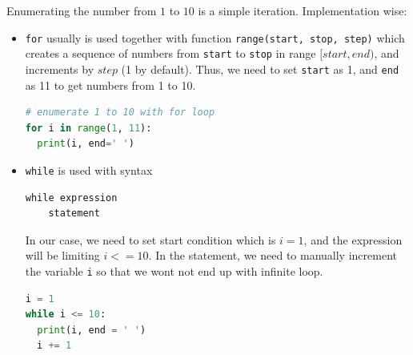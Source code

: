 \documentclass[../main.tex]{subfiles}
\begin{document}
Enumerating the number from $1$ to $10$ is a simple iteration. Implementation wise:
\begin{itemize}
    \item \texttt{for} usually is used together with function \texttt{range(start, stop, step)} which creates a sequence of numbers from \texttt{start} to \texttt{stop} in range $[start, end)$, and increments by $step$ (1 by default). Thus, we need to set \texttt{start} as 1, and \texttt{end} as 11 to get numbers from 1 to 10. 
\begin{lstlisting}[language=Python]
# enumerate 1 to 10 with for loop
for i in range(1, 11):
  print(i, end=' ')
\end{lstlisting}
\item \texttt{while} is used with syntax
\begin{lstlisting}[numbers=none]
while expression
    statement
\end{lstlisting}
In our case, we need to set start condition which is $i=1$, and the expression will be limiting $i <= 10$. In the statement, we need to manually increment the variable \texttt{i} so that we wont not end up with infinite loop.
\begin{lstlisting}[language=Python]
i = 1
while i <= 10:
  print(i, end = ' ')
  i += 1
\end{lstlisting}
\end{itemize}
\end{document}

